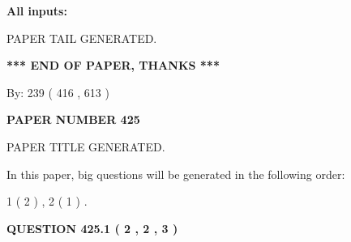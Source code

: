 \documentclass[12pt]{article}
\begin{document}
   
   
   
\noindent{}
   
   
   
   
\noindent\vspace{0.1in}\hspace{-0.08in} {\textbf{\Large{All inputs: }}}
   
   
   
   
   
   
 \vspace{0.2in}
 
   
   
\vspace{2.0in} PAPER TAIL GENERATED.
   
   
   
   
\vspace{1.0in} 
{\textbf{\large{ *** END OF PAPER, THANKS *** }}} 
   
   
\hspace{1.0in} By: 
 239 ( 416 ,  613 )
   
   
   
   
\newpage 
\setcounter{page}{ 
   425001 } 
   
   
   
   
 {\textbf{ \Large{ PAPER NUMBER  425  }}}
   
   
\vspace{0.2in}
   
   
   
   
   
   
   
   
 \vspace{0.2in}
 
 
 
 
   
   
 PAPER TITLE GENERATED.
   
   
   
\vspace{0.2in}
   
In this paper, big questions will be generated in the following order: 
   
   
   1 ( 2 )
 ,
   2 ( 1 )
 .
  
\vspace{0.2in}
  
{\textbf{\Large{QUESTION
425.1 
 ( 2 , 2 , 3 )
}}}
  
\end{document}
